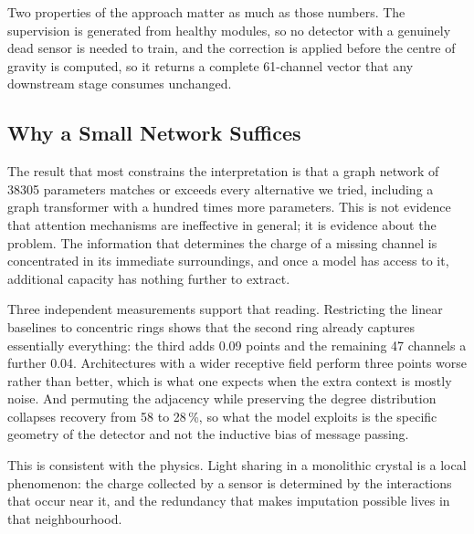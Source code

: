 \documentclass[10pt,conference]{IEEEtran}
\begin{document}
Two properties of the approach matter as much as those numbers. The supervision
is generated from healthy modules, so no detector with a genuinely dead sensor
is needed to train, and the correction is applied before the centre of gravity
is computed, so it returns a complete 61-channel vector that any downstream
stage consumes unchanged.

\subsection{Why a Small Network Suffices}

The result that most constrains the interpretation is that a graph network of
\num{38305} parameters matches or exceeds every alternative we tried, including
a graph transformer with a hundred times more parameters. This is not evidence
that attention mechanisms are ineffective in general; it is evidence about the
problem. The information that determines the charge of a missing channel is
concentrated in its immediate surroundings, and once a model has access to it,
additional capacity has nothing further to extract.

Three independent measurements support that reading. Restricting the linear
baselines to concentric rings shows that the second ring already captures
essentially everything: the third adds 0.09 points and the remaining 47
channels a further 0.04. Architectures with a wider receptive field perform
three points worse rather than better, which is what one expects when the extra
context is mostly noise. And permuting the adjacency while preserving the
degree distribution collapses recovery from 58 to 28\,\%, so what the model
exploits is the specific geometry of the detector and not the inductive bias of
message passing.

This is consistent with the physics. Light sharing in a monolithic crystal is a
local phenomenon: the charge collected by a sensor is determined by the
interactions that occur near it, and the redundancy that makes imputation
possible lives in that neighbourhood.

\end{document}
